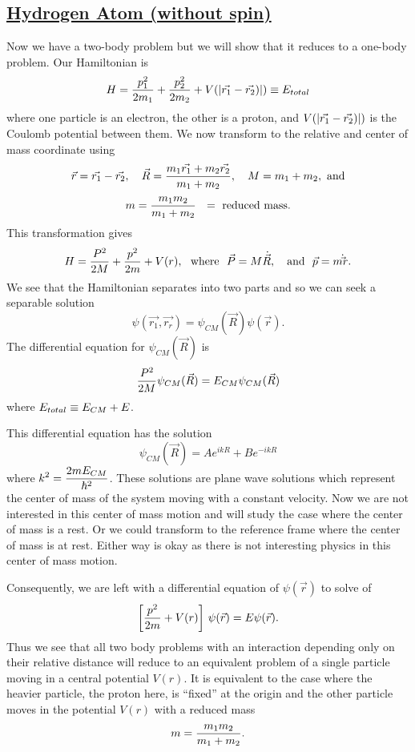 \subsection{\underline{Hydrogen Atom (without spin)}}
Now we have a two-body problem but we will show that it reduces to a one-body problem. Our Hamiltonian is 
\[ H = {p_1^2\over2m_1} + {p_2^2\over2m_2} + V(|\vec{r_1} - \vec{r_2})|) \equiv E_{total} \] where one particle is an electron, the other is a proton, and
$\displaystyle V(|\vec{r_1} - \vec{r_2})|)$ is the Coulomb potential between them. We now transform to the relative and center of mass coordinate using 
\[ \vec{r} = \vec{r_1} - \vec{r_2}, \quad \vec{R} = {m_1 \vec{r_1} + m_2\vec{r_2}\over m_1 + m_2}, \quad M = m_1 + m_2, \mbox{  and} \]
\[ m = {m_1m_2\over m_1 + m_2} ~~= \mbox{  reduced mass}.\]
This transformation gives 
\[ H = {P^2\over2M} + {p^2\over2m} + V(r), \mbox{~~where~~} \vec{P} = M\dot{\vec{R}}, \mbox{ ~ and ~} \vec{p} = m{\dot\vec{r}}. \]
We see that the Hamiltonian separates into two parts and so we can seek a separable solution 
$$\psi(\vec{r_1},\vec{r_r}) = \psi_{CM}(\vec{R}) \psi(\vec{r}).$$ 
The differential equation for $\psi_{CM}(\vec{R})$ is
$${P^2\over2M} \psi_{CM}(\vec{R}) = E_{CM} \psi_{CM}(\vec{R})$$ where $\displaystyle E_{total} \equiv E_{CM} + E$.

This differential equation has the solution \[ \psi_{CM}({\vec R}) = A e^{ikR} + B e^{-ikR} \] where $\displaystyle k^2 = {2mE_{CM}\over \hbar^2}$. These solutions are plane wave solutions which represent the center of mass of the system moving
with a constant velocity. Now we are not interested in this center of mass motion and will study the case where the center of mass is a rest. Or we could transform to the reference frame where the center of mass is at rest. 
Either way is okay as there is not interesting physics in this center of mass motion. 

Consequently, we are left with a differential equation of $\psi({\vec r})$ to solve of \[ \left[{p^2\over 2m} + V(r)\right] \, \psi({\vec r}) = E \psi({\vec r}).\]
Thus we see that all two body problems with an interaction depending only on their relative distance will reduce to an equivalent problem of a single particle moving in a central potential $V(r)$. It is equivalent to the case where
the heavier particle, the proton here, is ``fixed'' at the origin and the other particle moves in the potential $V(r)$ with a reduced mass \[ m = {m_1 m_2\over m_1 + m_2}.\] 




